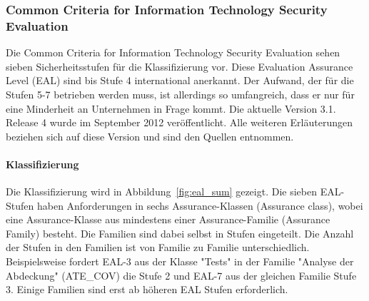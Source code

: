 \documentclass[11pt,a4paper]{report}
\begin{document}
\subsubsection{Common Criteria for Information Technology Security Evaluation}

Die Common Criteria for Information Technology Security Evaluation sehen sieben Sicherheitsstufen für die Klassifizierung vor. Diese Evaluation Assurance Level (EAL) sind bis Stufe 4 international anerkannt. Der Aufwand, der für die Stufen 5-7 betrieben werden muss, ist allerdings so umfangreich, dass er nur für eine Minderheit an Unternehmen in Frage kommt. Die aktuelle Version 3.1. Release 4 wurde im September 2012 veröffentlicht. Alle weiteren Erläuterungen beziehen sich auf diese Version und sind den Quellen \cite{ccp1, ccp2, ccp3, bsi_ccguide} entnommen.

\paragraph{Klassifizierung}

Die Klassifizierung wird in Abbildung~\ref{fig:eal_sum} gezeigt. Die sieben EAL-Stufen haben Anforderungen in sechs Assurance-Klassen (Assurance class), wobei eine Assurance-Klasse aus mindestens einer Assurance-Familie (Assurance Family) besteht. Die Familien sind dabei selbst in Stufen eingeteilt. Die Anzahl der Stufen in den Familien ist von Familie zu Familie unterschiedlich. Beispielsweise fordert EAL-3 aus der Klasse "Tests" in der Familie "Analyse der Abdeckung" (ATE\_COV) die Stufe 2 und EAL-7 aus der gleichen Familie Stufe 3. Einige Familien sind erst ab höheren EAL Stufen erforderlich. 
\end{document}
